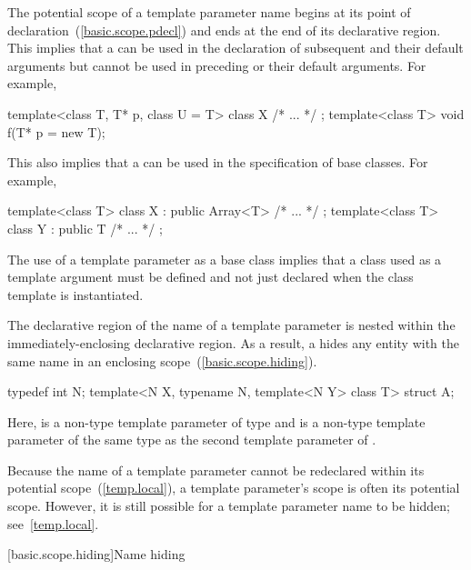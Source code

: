 \pnum
The potential scope of a template parameter name begins at its point of
declaration~(\ref{basic.scope.pdecl}) and ends at the end of its declarative region.
\enternote This implies that a  can be used in the
declaration of subsequent  and their default
arguments but cannot be used in preceding  or their
default arguments. For example,

\begin{codeblock}
template<class T, T* p, class U = T> class X { /* ... */ };
template<class T> void f(T* p = new T);
\end{codeblock}

This also implies that a  can be used in the
specification of base classes. For example,

\begin{codeblock}
template<class T> class X : public Array<T> { /* ... */ };
template<class T> class Y : public T { /* ... */ };
\end{codeblock}

The use of a template parameter as a base class implies that a class used as a template
argument must be defined and not just declared when the class template is instantiated.
\exitnote

\pnum
The declarative region of the name of a template parameter is nested within the
immediately-enclosing declarative region. \enternote As a result, a
 hides any entity with the same name in an enclosing
scope~(\ref{basic.scope.hiding}). \enterexample

\begin{codeblock}
typedef int N;
template<N X, typename N, template<N Y> class T> struct A;
\end{codeblock}

Here,  is a non-type template parameter of type  and  is a
non-type template parameter of the same type as the second template parameter of
. \exitexample\exitnote

\pnum
\enternote Because the name of a template parameter cannot be redeclared within its
potential scope~(\ref{temp.local}), a template parameter's scope is often its potential
scope. However, it is still possible for a template parameter name to be hidden;
see~\ref{temp.local}. \exitnote

[basic.scope.hiding]{Name hiding}

